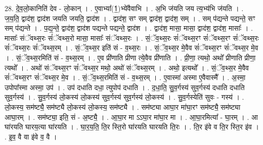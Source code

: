 \documentclass[17pt]{extarticle}
\begin{document}
28. दे॒व॒लो॒कानिति॑ देव - लो॒कान् । . ए॒वाभ्या᳚(1॒)भ्ये॑वैवाभि । . अ॒भि ज॑यति जय त्य॒भ्य॑भि ज॑यति । . ज॒य॒ति॒ द्वाद॑श॒ द्वाद॑श जयति जयति॒ द्वाद॑श । . द्वाद॑श॒ सꣳ सम् द्वाद॑श॒ द्वाद॑श॒ सम् । . सम् प॑द्यन्ते पद्यन्ते॒ सꣳ सम् प॑द्यन्ते । . प॒द्य॒न्ते॒ द्वाद॑श॒ द्वाद॑श पद्यन्ते पद्यन्ते॒ द्वाद॑श । . द्वाद॑श॒ मासा॒ मासा॒ द्वाद॑श॒ द्वाद॑श॒ मासाः᳚ । . मासाः᳚ संॅवथ्स॒रः सं॑ॅवथ्स॒रो मासा॒ मासाः᳚ संॅवथ्स॒रः । . सं॒ॅव॒थ्स॒रः सं॑ॅवथ्स॒रꣳ सं॑ॅवथ्स॒रꣳ सं॑ॅवथ्स॒रः सं॑ॅवथ्स॒रः सं॑ॅवथ्स॒रम् । . सं॒ॅव॒थ्स॒र इति॑ सं - व॒थ्स॒रः । . सं॒ॅव॒थ्स॒र मे॒वैव सं॑ॅवथ्स॒रꣳ सं॑ॅवथ्स॒र मे॒व । . सं॒ॅव॒थ्स॒रमिति॑ सं - व॒थ्स॒रम् । . ए॒व प्री॑णाति प्रीणा त्ये॒वैव प्री॑णाति । . प्री॒णा॒ त्यथो॒ अथो᳚ प्रीणाति प्रीणा॒ त्यथो᳚ । . अथो॑ संॅवथ्स॒रꣳ सं॑ॅवथ्स॒र मथो॒ अथो॑ संॅवथ्स॒रम् । . अथो॒ इत्यथो᳚ । . सं॒ॅव॒थ्स॒र मे॒वैव सं॑ॅवथ्स॒रꣳ सं॑ॅवथ्स॒र मे॒व । . सं॒ॅव॒थ्स॒रमिति॑ सं - व॒थ्स॒रम् । . ए॒वास्मा॑ अस्मा ए॒वैवास्मै᳚ । . अ॒स्मा॒ उपोपा᳚स्मा अस्मा॒ उप॑ । . उप॑ दधाति दधा॒ त्युपोप॑ दधाति । . द॒धा॒ति॒ सु॒व॒र्गस्य॑ सुव॒र्गस्य॑ दधाति दधाति सुव॒र्गस्य॑ । . सु॒व॒र्गस्य॑ लो॒कस्य॑ लो॒कस्य॑ सुव॒र्गस्य॑ सुव॒र्गस्य॑ लो॒कस्य॑ । . सु॒व॒र्गस्येति॑ सुवः - गस्य॑ । . लो॒कस्य॒ सम॑ष्ट्यै॒ सम॑ष्ट्यै लो॒कस्य॑ लो॒कस्य॒ सम॑ष्ट्यै । . सम॑ष्ट्या आघा॒र मा॑घा॒रꣳ सम॑ष्ट्यै॒ सम॑ष्ट्या आघा॒रम् । . सम॑ष्ट्या॒ इति॒ सं - अ॒ष्ट्यै॒ । . आ॒घा॒र मा ऽऽघा॒र मा॑घा॒र मा । . आ॒घा॒रमित्या᳚ - घा॒रम् । . आ घा॑रयति घारय॒त्या घा॑रयति । . घा॒र॒य॒ति॒ ति॒र स्ति॒रो घा॑रयति घारयति ति॒रः । . ति॒र इ॑वे व ति॒र स्ति॒र इ॑व । . इ॒व॒ वै वा इ॑वे व॒ वै । \newline
\end{document}
